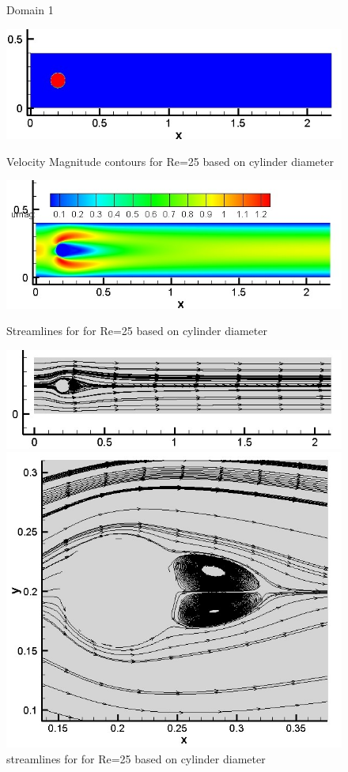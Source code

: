 \documentclass[12pt]{elsarticle}
\begin{document}
	\begin{figure}[h]
		\caption{Domain 1}
		\centering\includegraphics[width=0.7\linewidth]{55_immerssed_boundary_cylinder_domain}
		\caption{Velocity Magnitude contours for Re=25 based on cylinder diameter}
		\centering\includegraphics[width=0.7\linewidth]{55_immerssed_boundary_cylinder}
		\caption{Streamlines for for Re=25 based on cylinder diameter}
		\centering\includegraphics[width=0.7\linewidth]{55_immerssed_boundary_cylinder_streamlines}
		\caption{streamlines for for Re=25 based on cylinder diameter}
		\centering\includegraphics[width=0.7\linewidth]{55_immerssed_boundary_cylinder_streamlines_zoomed}
	\end{figure}
	
\end{document}
